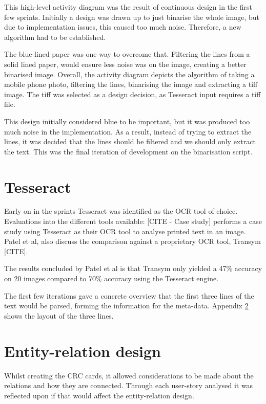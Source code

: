 This high-level activity diagram was the result of continuous design in the first few sprints. Initially a design was drawn up to just binarise the whole image, but due to implementation issues, this caused too much noise. Therefore, a new algorithm had to be established.

The blue-lined paper was one way to overcome that. Filtering the lines from a solid lined paper, would ensure less noise was on the image, creating a better binarised image. Overall, the activity diagram depicts the algorithm of taking a mobile phone photo, filtering the lines, binarising the image and extracting a tiff image. The tiff was selected as a design decision, as Tesseract input requires a tiff file.

This design initially considered blue to be important, but it was produced too much noise in the implementation. As a result, instead of trying to extract the lines, it was decided that the lines should be filtered and we should only extract the text. This was the final iteration of development on the binarisation script.

\section{Tesseract}
Early on in the sprints Tesseract was identified as the OCR tool of choice. Evaluations into the different tools available: [CITE - Case study] performs a case study using Tesseract as their OCR tool to analyse printed text in an image. Patel et al, also discuss the comparison against a proprietary OCR tool, Transym [CITE].

The results concluded by Patel et al is that Transym only yielded a 47\% accuracy on 20 images compared to 70\% accuracy using the Tesseract engine.

The first few iterations gave a concrete overview that the first three lines of the text would be parsed, forming the information for the meta-data. Appendix \ref{} shows the layout of the three lines.

\section{Entity-relation design}
Whilst creating the CRC cards, it allowed considerations to be made about the relations and how they are connected. Through each user-story analysed it was reflected upon if that would affect the entity-relation design.

